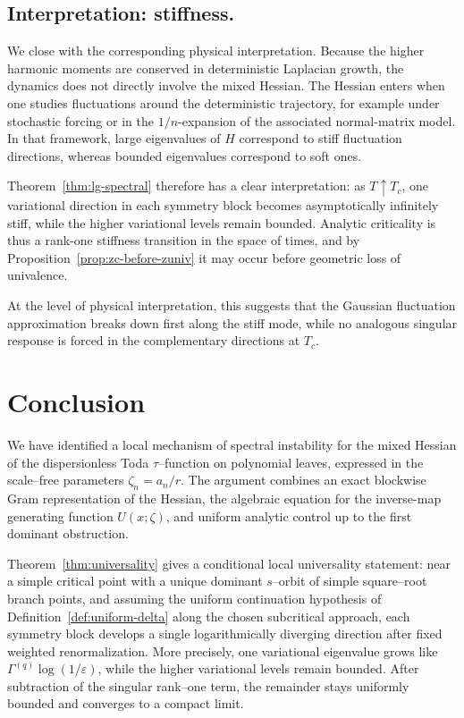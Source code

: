 \documentclass[11pt]{amsart}
\numberwithin{equation}{section}
\theoremstyle{plain}
\theoremstyle{definition}
\theoremstyle{remark}
\begin{document}
\subsection{Interpretation: stiffness.}\label{subsec:lg-stiffness}
We close with the corresponding physical interpretation. Because the higher harmonic moments are conserved in deterministic Laplacian growth, the dynamics does not directly involve the mixed Hessian. The Hessian enters when one studies fluctuations around the deterministic
trajectory, for example under stochastic forcing or in the \(1/n\)-expansion of the
associated normal-matrix model. In that framework, large eigenvalues of \(H\) correspond to
stiff fluctuation directions, whereas bounded eigenvalues correspond to soft ones.

Theorem~\ref{thm:lg-spectral} therefore has a clear interpretation: as \(T\uparrow T_c\),
one variational direction in each symmetry block becomes asymptotically infinitely stiff,
while the higher variational levels remain bounded. Analytic criticality is thus a
rank-one stiffness transition in the space of times, and by
Proposition~\ref{prop:zc-before-zuniv} it may occur before geometric loss of univalence.

At the level of physical interpretation, this suggests that the Gaussian fluctuation
approximation breaks down first along the stiff mode, while no analogous singular response
is forced in the complementary directions at \(T_c\).


\section{Conclusion}
\label{sec:conclusion}


We have identified a local mechanism of spectral instability for the mixed
Hessian of the dispersionless Toda $\tau$--function on polynomial leaves,
expressed in the scale--free parameters $\zeta_n=a_n/r$. The argument combines
an exact blockwise Gram representation of the Hessian, the algebraic equation
for the inverse-map generating function $U(x;\zeta)$, and uniform analytic
control up to the first dominant obstruction.

Theorem~\ref{thm:universality} gives a conditional local universality
statement: near a simple critical point with a unique dominant
$s$--orbit of simple square--root branch points, and assuming the uniform
continuation hypothesis of Definition~\ref{def:uniform-delta} along the chosen
subcritical approach, each symmetry block develops a single logarithmically
diverging direction after fixed weighted renormalization. More precisely, one
variational eigenvalue grows like \(\Gamma^{(q)}\log(1/\varepsilon)\), while the
higher variational levels remain bounded. After subtraction of the singular
rank--one term, the remainder stays uniformly bounded and converges to a
compact limit.
\end{document}
